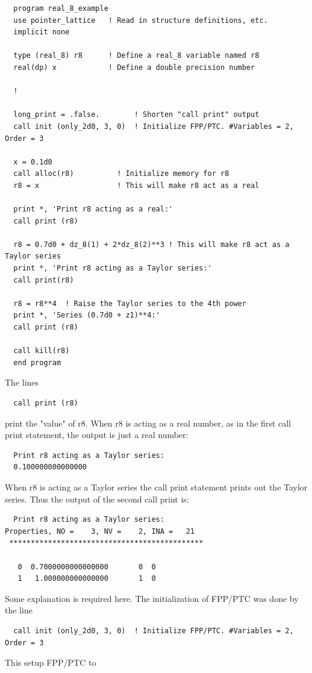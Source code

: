 \documentclass[english,12pt,article]{article} %
\begin{document}
{\footnotesize
\begin{verbatim}
  program real_8_example
  use pointer_lattice   ! Read in structure definitions, etc.
  implicit none

  type (real_8) r8      ! Define a real_8 variable named r8
  real(dp) x            ! Define a double precision number

  !

  long_print = .false.        ! Shorten "call print" output
  call init (only_2d0, 3, 0)  ! Initialize FPP/PTC. #Variables = 2, Order = 3

  x = 0.1d0
  call alloc(r8)          ! Initialize memory for r8
  r8 = x                  ! This will make r8 act as a real

  print *, 'Print r8 acting as a real:'
  call print (r8)

  r8 = 0.7d0 + dz_8(1) + 2*dz_8(2)**3 ! This will make r8 act as a Taylor series
  print *, 'Print r8 acting as a Taylor series:'
  call print(r8)

  r8 = r8**4  ! Raise the Taylor series to the 4th power
  print *, 'Series (0.7d0 + z1)**4:'
  call print (r8)

  call kill(r8)
  end program
\end{verbatim}
}

The lines
\begin{verbatim}
  call print (r8)
\end{verbatim}
print the "value" of r8. When r8 is acting as a real number, as in the first call print statement, the output is just a real number:
{\scriptsize
\begin{verbatim}
  Print r8 acting as a Taylor series:
  0.100000000000000
\end{verbatim}
}

When r8 is acting as a Taylor series the call print statement prints out the Taylor series. Thus the output of the second call print is:
{\scriptsize
\begin{verbatim}
  Print r8 acting as a Taylor series:
Properties, NO =    3, NV =    2, INA =   21
 *********************************************

   0  0.7000000000000000       0  0
   1   1.000000000000000       1  0
\end{verbatim}
}
Some explanation is required here. The initialization of FPP/PTC was done by the line
{\scriptsize
\begin{verbatim}
  call init (only_2d0, 3, 0)  ! Initialize FPP/PTC. #Variables = 2, Order = 3
\end{verbatim}
}
This setup FPP/PTC to 
\end{document}
